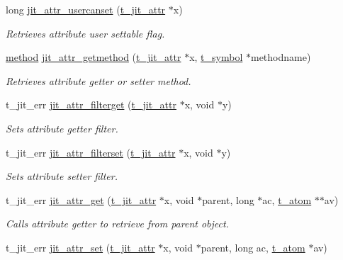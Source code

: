 \begin{DoxyCompactItemize}
long \hyperlink{group__attrmod_ga89141c07259e2b3a568b7879874a20be}{jit\_\-attr\_\-usercanset} (\hyperlink{structt__jit__attr}{t\_\-jit\_\-attr} $\ast$x)
\begin{DoxyCompactList}\small\item\em Retrieves attribute user settable flag. \item\end{DoxyCompactList}\item 
\hyperlink{group__datatypes_gac26ba0a173b50597f5738132e059b42d}{method} \hyperlink{group__attrmod_gadbc0727e253f6307bda9ac0becd132a9}{jit\_\-attr\_\-getmethod} (\hyperlink{structt__jit__attr}{t\_\-jit\_\-attr} $\ast$x, \hyperlink{structt__symbol}{t\_\-symbol} $\ast$methodname)
\begin{DoxyCompactList}\small\item\em Retrieves attribute getter or setter method. \item\end{DoxyCompactList}\item 
t\_\-jit\_\-err \hyperlink{group__attrmod_ga9a5cdc2a025611cacfe1dd41f87fd387}{jit\_\-attr\_\-filterget} (\hyperlink{structt__jit__attr}{t\_\-jit\_\-attr} $\ast$x, void $\ast$y)
\begin{DoxyCompactList}\small\item\em Sets attribute getter filter. \item\end{DoxyCompactList}\item 
t\_\-jit\_\-err \hyperlink{group__attrmod_gaa407b91c0f3a0084a20d4fab325a69ac}{jit\_\-attr\_\-filterset} (\hyperlink{structt__jit__attr}{t\_\-jit\_\-attr} $\ast$x, void $\ast$y)
\begin{DoxyCompactList}\small\item\em Sets attribute setter filter. \item\end{DoxyCompactList}\item 
t\_\-jit\_\-err \hyperlink{group__attrmod_gab54f36f1cbdbdbb08ee83826ac3b47e5}{jit\_\-attr\_\-get} (\hyperlink{structt__jit__attr}{t\_\-jit\_\-attr} $\ast$x, void $\ast$parent, long $\ast$ac, \hyperlink{structt__atom}{t\_\-atom} $\ast$$\ast$av)
\begin{DoxyCompactList}\small\item\em Calls attribute getter to retrieve from parent object. \item\end{DoxyCompactList}\item 
t\_\-jit\_\-err \hyperlink{group__attrmod_ga04bb490b921cfd22290b8513d63702ec}{jit\_\-attr\_\-set} (\hyperlink{structt__jit__attr}{t\_\-jit\_\-attr} $\ast$x, void $\ast$parent, long ac, \hyperlink{structt__atom}{t\_\-atom} $\ast$av)
$$
\end{DoxyCompactItemize}
